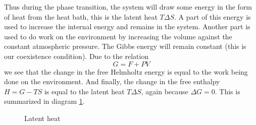\documentclass[a4paper, draft]{article}
\theoremstyle{own}
\theoremstyle{remark}
\begin{document}
Thus during the phase transition, the system will draw some energy in the form of heat from the heat bath, this is the latent heat $T \Delta S$. A part of this energy is used to increase the internal energy and remains in the system. Another part is used to do work on the environment by increasing the volume against the constant atmospheric pressure. The Gibbs energy will remain constant (this is our coexistence condition). Due to the relation
$$
G = F + PV
$$
we see that the change in the free Helmholtz energy is equal to the work being done on the environment. And finally, the change in the free enthalpy $H = G - TS$ is equal to the latent heat $T \Delta S$, again because $\Delta G = 0$. This is summarized in diagram \ref{fig:latentheat}.

\begin{figure}[ht]
	\begin{center}
	\end{center}
	\caption{Latent heat}
	\label{fig:latentheat}

\end{figure}
\end{document}
